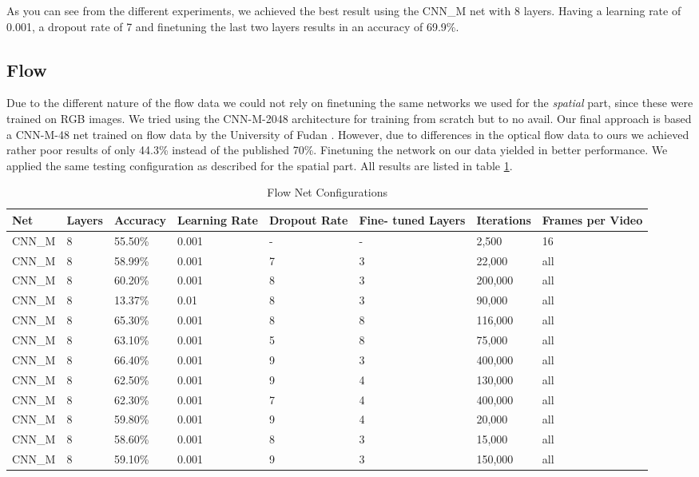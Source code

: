 As you can see from the different experiments, we achieved the best result using the CNN\_M net with 8 layers.
Having a learning rate of 0.001, a dropout rate of 7 and finetuning the last two layers results in an accuracy of 69.9\%.

\subsection{Flow}
\label{subsec:flow}
Due to the different nature of the flow data we could not rely on finetuning the same networks we used for the \emph{spatial} part, since these were trained on RGB images.
We tried using the CNN-M-2048 architecture for training from scratch but to no avail.
Our final approach is based a CNN-M-48 net trained on flow data by the University of Fudan \cite{wu2015modeling}.
However, due to differences in the optical flow data to ours we achieved rather poor results of only 44.3\% instead of the published 70\%.
Finetuning the network on our data yielded in better performance.
We applied the same testing configuration as described for the spatial part.
All results are listed in table \ref{table:flow_results}.

\begin{table}[H]
\centering
\caption{Flow Net Configurations}
\label{table:flow_results}
\begin{tabularx}{\textwidth}{XXXXXXXX}
\toprule
Net 		& Layers	& Accuracy	& Learning Rate 	& Dropout Rate	& Fine- tuned Layers	& Iterations	& Frames per Video \\ \midrule

CNN\_M & 8 & 55.50\%  & 0.001 & - & - &   2,500 & 16\\
CNN\_M & 8 & 58.99\%  & 0.001 & 7 & 3 &  22,000 & all \\
CNN\_M & 8 & 60.20\%  & 0.001 & 8 & 3 & 200,000 & all \\
CNN\_M & 8 & 13.37\%  & 0.01  & 8 & 3 &  90,000 & all \\
CNN\_M & 8 & 65.30\%  & 0.001 & 8 & 8 & 116,000 & all \\
CNN\_M & 8 & 63.10\%  & 0.001 & 5 & 8 &  75,000 & all \\
CNN\_M & 8 & 66.40\%  & 0.001 & 9 & 3 & 400,000 & all \\
CNN\_M & 8 & 62.50\%  & 0.001 & 9 & 4 & 130,000 & all \\
CNN\_M & 8 & 62.30\%  & 0.001 & 7 & 4 & 400,000 & all \\
CNN\_M & 8 & 59.80\%  & 0.001 & 9 & 4 &  20,000 & all \\
CNN\_M & 8 & 58.60\%  & 0.001 & 8 & 3 &  15,000 & all \\
CNN\_M & 8 & 59.10\%  & 0.001 & 9 & 3 & 150,000 & all \\

\bottomrule
\end{tabularx}
\end{table}


